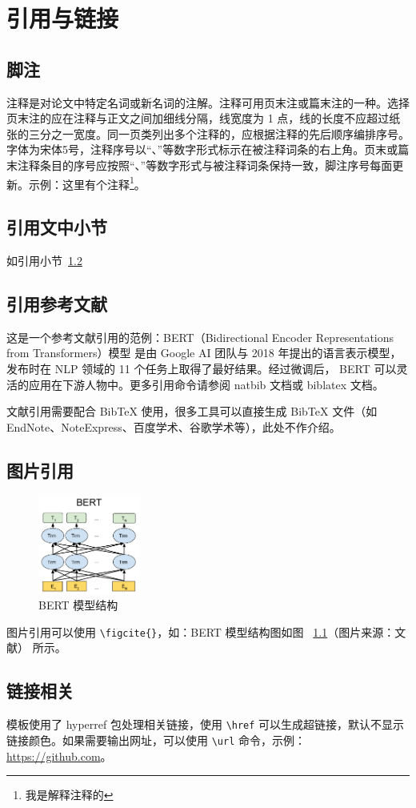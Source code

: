 
\chapter{引用与链接}

\section{脚注}
注释是对论文中特定名词或新名词的注解。注释可用页末注或篇末注的一种。选择页末注的应在注释与正文之间加细线分隔，线宽度为 1 点，线的长度不应超过纸张的三分之一宽度。同一页类列出多个注释的，应根据注释的先后顺序编排序号。字体为宋体5号，注释序号以“、”等数字形式标示在被注释词条的右上角。页末或篇末注释条目的序号应按照“、”等数字形式与被注释词条保持一致，脚注序号每面更新。示例：这里有个注释\footnote{我是解释注释的}。

\section{引用文中小节}\label{sec:ref}
如引用小节~\ref{sec:ref}

\section{引用参考文献}
这是一个参考文献引用的范例：BERT（Bidirectional Encoder Representations from Transformers）模型 \cite{devlin2018bert} 是由 Google AI 团队与 2018 年提出的语言表示模型，发布时在 NLP 领域的 11 个任务上取得了最好结果。经过微调后， BERT 可以灵活的应用在下游人物中。更多引用命令请参阅 natbib 文档或 biblatex 文档。\nocite{*}

文献引用需要配合 BibTeX 使用，很多工具可以直接生成 BibTeX 文件（如 EndNote、NoteExpress、百度学术、谷歌学术等），此处不作介绍。

\section{图片引用}

\begin{figure}[htbp]
    \centering
    \includegraphics[width=0.3\textwidth]{figures/bert.png}
    \caption{BERT 模型结构}
    \label{fig:bert}
\end{figure}

图片引用可以使用 \verb|\figcite{}|，如：BERT 模型结构图如图 ~\ref{fig:bert}（图片来源：文献） 所示。

\section{链接相关}
模板使用了 hyperref 包处理相关链接，使用 \verb|\href| 可以生成超链接，默认不显示链接颜色。如果需要输出网址，可以使用 \verb|\url| 命令，示例：\url{https://github.com}。